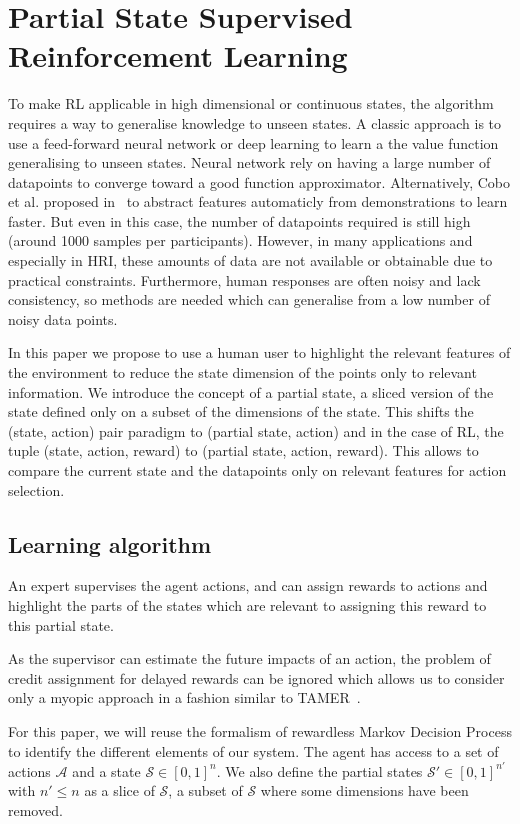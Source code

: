 \documentclass[letterpaper]{article} %
\begin{document}
\section{Partial State Supervised Reinforcement Learning}

To make RL applicable in high dimensional or continuous states, the algorithm
requires a way to generalise knowledge to unseen states. A classic approach is
to use a feed-forward neural network or deep learning to learn a the value
function generalising to unseen states. Neural network rely on having a large
number of datapoints to converge toward a good function approximator.
Alternatively, Cobo et al. proposed in~\cite{cobo2011automatic} to abstract
features automaticly from demonstrations to learn faster. But even in this case,
the number of datapoints required is still high (around 1000 samples per
participants). However, in many applications and especially in HRI, these
amounts of data are not available or obtainable due to practical constraints.
Furthermore, human responses are often noisy and lack consistency, so methods
are needed which can generalise from a low number of noisy data points.

In this paper we propose to use a human user to highlight the relevant features
of the environment to reduce the state dimension of the points only to relevant
information.  We introduce the concept of a partial state, a sliced version of
the state defined only on a subset of the dimensions of the state. This shifts
the (state, action) pair paradigm to (partial state, action)  and in the case of
RL, the tuple (state, action, reward) to (partial state, action, reward). This
allows to compare the current state and the datapoints only on relevant features
for action selection.

\subsection{Learning algorithm}

An expert supervises the agent actions, and can assign rewards to actions and
highlight the parts of the states which are relevant to assigning this reward to
this partial state.

As the supervisor can estimate the future impacts of an action, the problem of
credit assignment for delayed rewards can be ignored which allows us to consider
only a myopic approach in a fashion similar to TAMER~\cite{knox2009interactively}. 

For this paper, we will reuse the formalism of rewardless Markov Decision
Process to identify the different elements of our system. The agent has access
to a set of actions $\mathcal{A}$ and a state $\mathcal{S} \in [0,1]^{n}$. We
also define the partial states $\mathcal{S'} \in [0,1]^{n'}$ with $n' \leq n$ as
a slice of $\mathcal{S}$, a subset of $\mathcal{S}$ where some dimensions have
been removed. 
\end{document}
